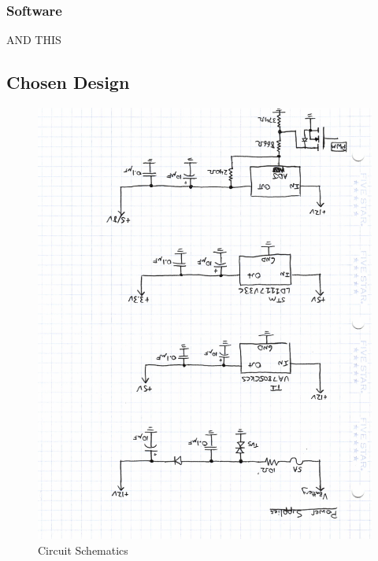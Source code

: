 \documentclass[12pt,letterpaper]{article}
\begin{document}
\subsubsection{Software}
AND THIS

\subsection{Chosen Design}
\begin{figure}[H]
\centering
\includegraphics[page=1, totalheight=20cm, angle=180]{images/circuit_sch.pdf}
\caption{Circuit Schematics}
\label{fig: image}
\end{figure}
\end{document}
